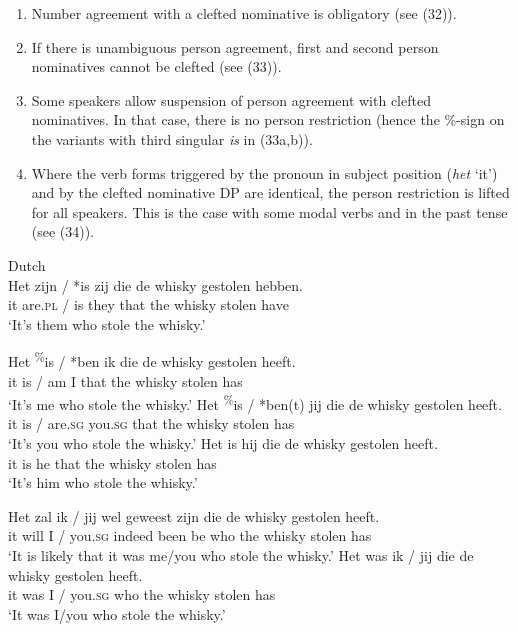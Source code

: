 \documentclass[output=paper]{langsci/langscibook}
\begin{document}
\begin{enumerate}[label=(\roman*)]
\item  Number agreement with a clefted nominative is obligatory (see (32)). 
\item  If there is unambiguous person agreement, first and second person nominatives cannot be clefted (see (33)). 
\item Some speakers allow suspension of person agreement with clefted nominatives. In that case, there is no person restriction (hence the \%-sign on the variants with third singular \textit{is} in (33a,b)). 
\item  Where the verb forms triggered by the pronoun in subject position (\textit{het} ‘it’) and by the clefted nominative DP are identical, the person restriction is lifted for all speakers. This is the case with some modal verbs and in the past tense (see (34)).
\end{enumerate}

\ea \label{bkm:Ref295486016}  Dutch\\
 \gll Het zijn / *is   zij   die   de whisky gestolen hebben.\\
    it    are.\textsc{pl} / is they that the whisky stolen     have\\
\glt   ‘It’s them who stole the whisky.’  
\z

\ea \label{bkm:Ref295486091}  
\ea \gll Het \textsuperscript{\%}is / *ben ik die  de  whisky gestolen heeft.\\
    it       is / am    I  that the whisky stolen      has\\
\glt    ‘It’s me who stole the whisky.’
\ex 
\gll Het \textsuperscript{\%}is / *ben(t) jij         die  de  whisky gestolen heeft.\\
    it      is / are.\textsc{sg}   you.\textsc{sg} that the whisky stolen      has\\
\glt    ‘It’s you who stole the whisky.’
\ex 
\gll Het is hij die  de  whisky gestolen heeft.\\
    it     is he that the whisky stolen     has\\
\glt  ‘It’s him who stole the whisky.’
\z
\z


\ea \label{bkm:Ref295486338}  
\ea \gll Het zal  ik / jij      wel      geweest zijn die  de  whisky gestolen heeft.\\
    it    will I / you.\textsc{sg} indeed been      be   who the whisky stolen     has\\
\glt    ‘It is likely that it was me/you who stole the whisky.’
\ex \gll  Het was ik / jij        die  de  whisky gestolen heeft.\\
    it     was I / you.\textsc{sg} who the whisky stolen      has\\
\glt  ‘It was I/you who stole the whisky.’
\z
\z
\end{document}
